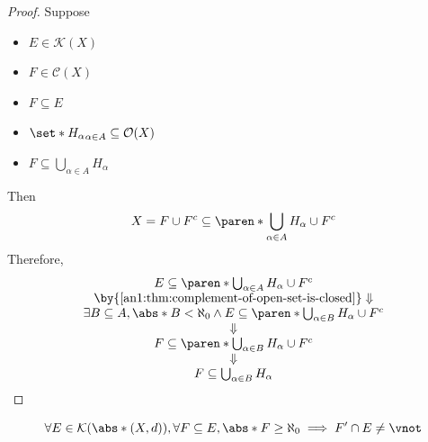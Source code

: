 \begin{proof}
  Suppose
  \begin{itemize}
    \item $E \in \mathcal{K}(X)$
    \item $F \in \mathcal{C}(X)$
    \item $F \subseteq E$
    \item $\set*{H_{\alpha}}_{\alpha \in A} \subseteq \mathcal{O}(X)$
    \item $F \subseteq \bigcup_{\alpha \in A} H_{\alpha}$
  \end{itemize}
  Then
  \[
    X = F \cup F^{c} \subseteq \paren*{\bigcup_{\alpha \in A} H_{\alpha}} \cup F^{c}
  \]
  Therefore,
  \[
    \begin{array}{c}
      E \subseteq \paren*{\bigcup_{\alpha \in A} H_{\alpha}} \cup F^{c}                                                    \\
      \by{\Cref{an1:thm:complement-of-open-set-is-closed}} \Downarrow                                                      \\
      \exists B \subseteq A, \abs*{B} < \aleph_{0} \land E \subseteq \paren*{\bigcup_{\alpha \in B} H_{\alpha}} \cup F^{c} \\
      \Downarrow                                                                                                           \\
      F \subseteq \paren*{\bigcup_{\alpha \in B} H_{\alpha}} \cup F^{c}                                                    \\
      \Downarrow                                                                                                           \\
      F \subseteq \bigcup_{\alpha \in B} H_{\alpha}
    \end{array}
  \]
\end{proof}

\begin{theorem} \label{an1:thm:infinite-subset-of-compact-set-has-limit-point}
  \[
    \forall E \in \mathcal{K}(\abs*{(X, d)}), \forall F \subseteq E, \abs*{F} \geq \aleph_{0} \implies F' \cap E \neq \vnot
  \]
\end{theorem}

